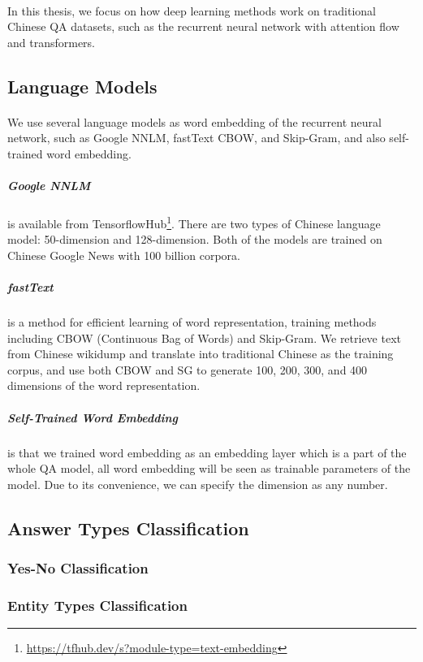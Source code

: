 \documentclass{article}
\begin{document}
\paragraph{}
In this thesis, we focus on how deep learning methods work on traditional Chinese QA datasets, such as the recurrent neural network with attention flow and transformers.

\subsection{Language Models}
\paragraph{}
We use several language models as word embedding of the recurrent neural network, such as Google NNLM, fastText\cite{bojanowski2017enriching} CBOW, and Skip-Gram, and also self-trained word embedding.

\subparagraph{Google NNLM} is available from TensorflowHub\footnote{\url{https://tfhub.dev/s?module-type=text-embedding}}. There are two types of Chinese language model: 50-dimension and 128-dimension. Both of the models are trained on Chinese Google News with 100 billion corpora.

\subparagraph{fastText} is a method for efficient learning of word representation, training methods including CBOW (Continuous Bag of Words) and Skip-Gram. We retrieve text from Chinese wikidump and translate into traditional Chinese as the training corpus, and use both CBOW and SG to generate 100, 200, 300, and 400 dimensions of the word representation.

\subparagraph{Self-Trained Word Embedding} is that we trained word embedding as an embedding layer which is a part of the whole QA model, all word embedding will be seen as trainable parameters of the model. Due to its convenience, we can specify the dimension as any number.

\subsection{Answer Types Classification}
\subsubsection{Yes-No Classification}
\subsubsection{Entity Types Classification}
\end{document}
